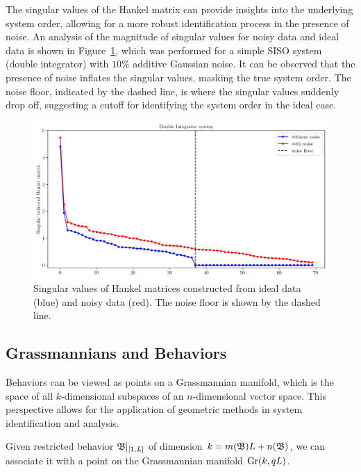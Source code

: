 The singular values of the Hankel matrix can provide insights into the underlying system order, allowing for a more robust identification process in the presence of noise. An analysis of the magnitude of singular values for noisy data and ideal data is shown in Figure~\ref{fig:svd_noise}, which was performed for a simple SISO system (double integrator) with $10\%$ additive Gaussian noise. It can be observed that the presence of noise inflates the singular values, masking the true system order. The noise floor, indicated by the dashed line, is where the singular values suddenly drop off, suggesting a cutoff for identifying the system order in the ideal case.

\begin{figure}[h]
      \centering
      \includegraphics[width=\textwidth]{figures/noise_floor.png}
      \caption{Singular values of Hankel matrices constructed from ideal data (blue) and noisy data (red). The noise floor is shown by the dashed line.}
      \label{fig:svd_noise}
\end{figure}

\subsection{Grassmannians and Behaviors}
Behaviors can be viewed as points on a Grassmannian manifold, which is the space of all $k$-dimensional subspaces of an $n$-dimensional vector space. This perspective allows for the application of geometric methods in system identification and analysis.

Given restricted behavior $\mathfrak{B}|_{[1,L]}$ of dimension $k = m(\mathfrak{B})L + n(\mathfrak{B})$, we can associate it with a point on the Grassmannian manifold $\text{Gr}(k, qL)$.

